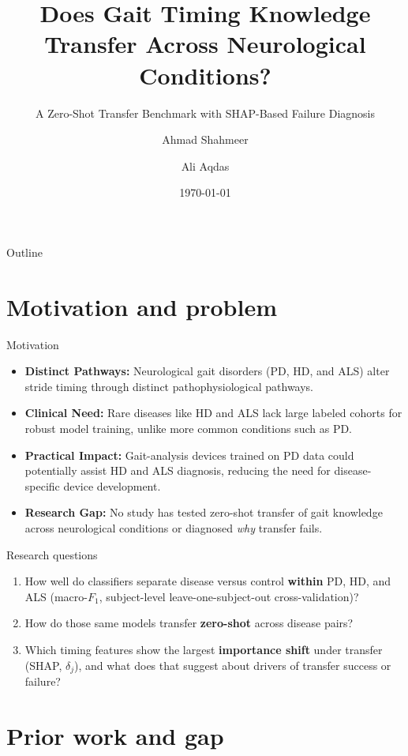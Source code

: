 \documentclass[aspectratio=43,10pt]{beamer}
\title{Does Gait Timing Knowledge Transfer Across Neurological Conditions?}
\subtitle{A Zero-Shot Transfer Benchmark with SHAP-Based Failure Diagnosis}
\author{Ahmad Shahmeer \and Ali Aqdas}
\institute{SEECS $|$ NUST \\}
\date{\today}
\begin{document}
\begin{frame}
  \titlepage
\end{frame}

\begin{frame}{Outline}
  \tableofcontents
\end{frame}

\section{Motivation and problem}

\begin{frame}{Motivation}
  \begin{itemize}
    \item \textbf{Distinct Pathways:} Neurological gait disorders (PD, HD, and ALS) alter stride timing through distinct pathophysiological pathways.
    \item \textbf{Clinical Need:} Rare diseases like HD and ALS lack large labeled cohorts for robust model training, unlike more common conditions such as PD.
    \item \textbf{Practical Impact:} Gait-analysis devices trained on PD data could potentially assist HD and ALS diagnosis, reducing the need for disease-specific device development.
    \item \textbf{Research Gap:} No study has tested zero-shot transfer of gait knowledge across neurological conditions or diagnosed \emph{why} transfer fails.
  \end{itemize}
\end{frame}

\begin{frame}{Research questions}
  \begin{enumerate}
    \item How well do classifiers separate disease versus control \textbf{within} PD, HD, and ALS (macro-$F_1$, subject-level leave-one-subject-out cross-validation)?
    \item How do those same models transfer \textbf{zero-shot} across disease pairs?
    \item Which timing features show the largest \textbf{importance shift} under transfer (SHAP, \textbf{$\delta_j$}), and what does that suggest about drivers of transfer success or failure?
  \end{enumerate}
\end{frame}

\section{Prior work and gap}
\end{document}
